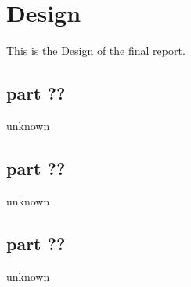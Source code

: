 \section{Design} 
This is the Design of the final report.
\subsection{part ??}
unknown
\subsection{part ??}
unknown
\subsection{part ??}
unknown

\newpage